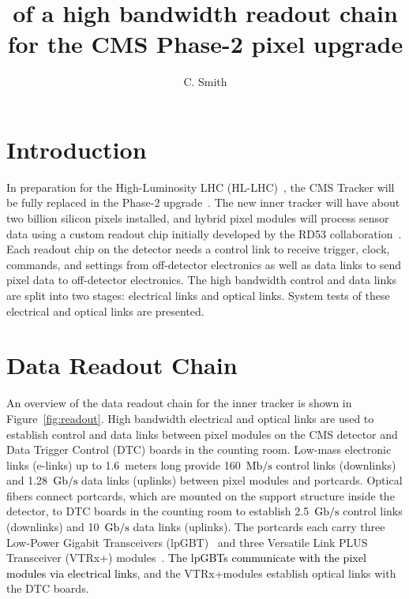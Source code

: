 \documentclass[a4paper,11pt]{article}
\title{\black{Characterization} of a high bandwidth readout chain for the CMS Phase-2 pixel upgrade}
\author{C. Smith}
\affiliation{The University of Kansas,\\Lawrence, Kansas 66045, USA}
\newcommand{\vtrxp}{VTRx+}
\newcommand{\fig}{Figure}
\newcommand{\mbps}{\ensuremath{\mathrm{Mb}/\mathrm{s}}\xspace}
\newcommand{\gbps}{\ensuremath{\mathrm{Gb}/\mathrm{s}}\xspace}
\newcommand{\black}{\textcolor{black}}
\begin{document}

\maketitle

\flushbottom

\newpage


\section{Introduction}
\label{sec:introduction}

In preparation for the High-Luminosity LHC (HL-LHC)~\cite{ref:hllhc}, the CMS Tracker will be fully replaced in the Phase-2 upgrade~\cite{ref:cms,ref:tdr,ref:orfanelli}.
The new inner tracker will have about two billion silicon pixels installed,
and hybrid pixel modules will process sensor data using a custom readout chip initially developed by the RD53 collaboration~\cite{ref:rd53}.
Each readout chip on the detector needs a control link to receive trigger, clock, commands, and settings from off-detector electronics as well as data links to send pixel data to off-detector electronics.
The high bandwidth control and data links are split into two stages: electrical links and optical links.
System tests of these electrical and optical links are presented.

\section{Data Readout Chain}
\label{sec:readout}

An overview of the data readout chain for the inner tracker is shown in \fig~\ref{fig:readout}.
High bandwidth electrical and optical links are used to establish control and data links between pixel modules on the CMS detector and Data Trigger Control (DTC) boards in the counting room.
Low-mass electronic links (e-links) up to 1.6~meters long provide 160~\black{\mbps} control links (downlinks) and 1.28~\black{\gbps} data links (uplinks) between pixel modules and portcards.
Optical fibers connect portcards, which are mounted on the support structure inside the detector, to DTC boards in the counting room to establish 2.5~\black{\gbps} control links (downlinks) and 10~\black{\gbps} data links (uplinks).
The portcards each carry three Low-Power Gigabit Transceivers (lpGBT)~\cite{ref:lpgbt_1} and three Versatile Link PLUS Transceiver (\vtrxp) modules~\cite{ref:vtrxp}.
\black{The lpGBTs communicate with the pixel modules via electrical links}, and the \vtrxp\space modules establish optical links with the DTC boards.
\end{document}
